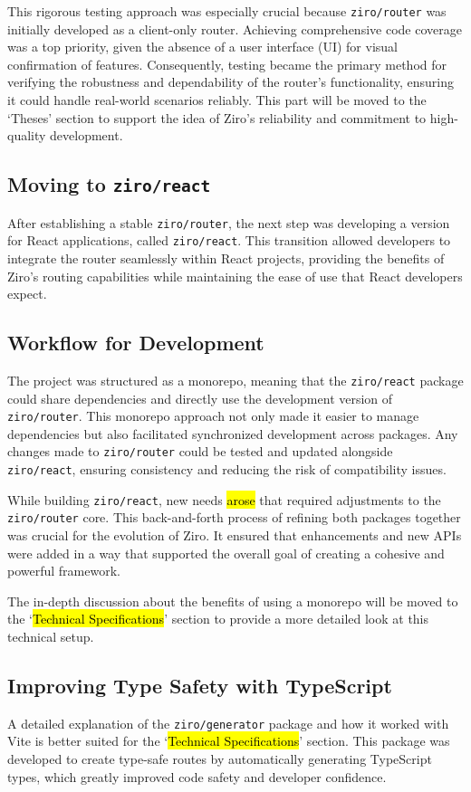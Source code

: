 This rigorous testing approach was especially crucial because \texttt{ziro/router} was initially developed as a client-only router. Achieving comprehensive code coverage was a top priority, given the absence of a user interface (UI) for visual confirmation of features. Consequently, testing became the primary method for verifying the robustness and dependability of the router’s functionality, ensuring it could handle real-world scenarios reliably. This part will be moved to the ‘Theses’ section to support the idea of Ziro’s reliability and commitment to high-quality development.

\subsection{Moving to \texttt{ziro/react}}
After establishing a stable \texttt{ziro/router}, the next step was developing a version for React applications, called \texttt{ziro/react}. This transition allowed developers to integrate the router seamlessly within React projects, providing the benefits of Ziro’s routing capabilities while maintaining the ease of use that React developers expect.

\subsection{Workflow for Development}
The project was structured as a monorepo, meaning that the \texttt{ziro/react} package could share dependencies and directly use the development version of \texttt{ziro/router}. This monorepo approach not only made it easier to manage dependencies but also facilitated synchronized development across packages. Any changes made to \texttt{ziro/router} could be tested and updated alongside \texttt{ziro/react}, ensuring consistency and reducing the risk of compatibility issues.

While building \texttt{ziro/react}, new needs \hl{arose} that required adjustments to the \texttt{ziro/router} core. This back-and-forth process of refining both packages together was crucial for the evolution of Ziro. It ensured that enhancements and new APIs were added in a way that supported the overall goal of creating a cohesive and powerful framework.

The in-depth discussion about the benefits of using a monorepo will be moved to the ‘\hl{Technical Specifications}’ section to provide a more detailed look at this technical setup.

\subsection{Improving Type Safety with TypeScript}
A detailed explanation of the \texttt{ziro/generator} package and how it worked with Vite is better suited for the ‘\hl{Technical Specifications}’ section. This package was developed to create type-safe routes by automatically generating TypeScript types, which greatly improved code safety and developer confidence.

